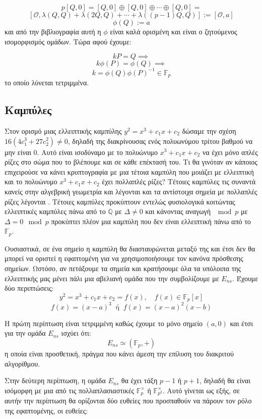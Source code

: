\documentclass[oneside,a4paper]{article}
\begin{document}
$$p[Q,0] = [Q,0] \oplus [Q,0] \oplus \cdots \oplus [Q,0] = $$
$$[\mathcal{O}, \lambda(Q,Q) + \lambda(2Q,Q) + \cdots + \lambda((p-1)Q,Q)] :=[\mathcal{O},a]$$
$$\phi(Q) := a$$ και από την βιβλιογραφία \cite{semaev} αυτή η $\phi$ είναι καλά ορισμένη και είναι ο ζητούμενος ισομορφισμός ομάδων. Τώρα αφού έχουμε:



$$k P = Q \implies $$
$$k \phi(P) = \phi(Q) \implies $$
$$k = \phi(Q) \phi(P)^{-1} \in \mathbb{F}_p$$ το οποίο λύνεται τετριμμένα.



\subsection{ Καμπύλες}
Στον ορισμό μιας ελλειπτικής καμπύλης $y^2 = x^3 + c_1 x +c_2$ δώσαμε την σχέση $16(4c_1^3 +27c_2^2)\neq 0$, δηλαδή της διακρίνουσας ενός πολυωνύμου τρίτου βαθμού να μην είναι $0$. Αυτό είναι ισοδύναμο με το πολυώνυμο $x^3 +c_1 x+c_2$ να έχει μόνο απλές ρίζες στο σώμα που το βλέπουμε και σε κάθε επέκτασή του. Τι θα γινόταν αν κάποιος επιχειρούσε να κάνει κρυπτογραφία με μια τέτοια καμπύλη που μοιάζει με ελλειπτική και το πολυώνυμο $x^3 + c_1x+c_2$ έχει πολλαπλές ρίζες? Τέτοιες καμπύλες τις συναντά κανείς στην αλγεβρική γεωμετρία και λέγονται  και τα αντίστοιχα σημεία με πολλαπλές ρίζες λέγονται . Τέτοιες καμπύλες προκύπτουν εντελώς φυσιολογικά κοιτώντας ελλειπτικές καμπύλες πάνω από το $\mathbb{Q}$ με $\Delta \neq 0$ και κάνοντας αναγωγή $\mod p$ με $\Delta = 0 \mod p$ προκύπτει πλέον μια καμπύλη που δεν είναι ελλειπτική πάνω από το $\mathbb{F}_p$.

Ουσιαστικά, σε ένα  σημείο η καμπύλη θα διασταυρώνεται μεταξύ της και έτσι δεν θα μπορεί να οριστεί η εφαπτομένη για να χρησιμοποιήσουμε τον κανόνα πρόσθεσης σημείων. Ωστόσο, αν πετάξουμε τα  σημεία και κρατήσουμε όλα τα υπόλοιπα της ελλειπτικής μας μένει πάλι μια αβελιανή ομάδα που την συμβολίζουμε με $E_{ns}$. Έχουμε δύο περιπτώσεις:
$$y^2 = x^3+c_1 x+c_2 = f(x), \quad f(x) \in \mathbb{F}_p[x]$$
$$f(x) = (x-a)^3 \ \text{ ή } \ f(x) = (x-a)^2(x-b)$$

Η πρώτη περίπτωση είναι τετριμμένη καθώς έχουμε το μόνο  σημείο $(a,0)$ και έτσι για την ομάδα $E_{ns}$ ισχύει ότι:
$$E_{ns} \simeq (\mathbb{F}_p,+)$$ η οποία είναι προσθετική, πράγμα που κάνει άμεση την επίλυση του διακριτού αλγορίθμου.

Στην δεύτερη περίπτωση, η ομάδα $E_{ns}$ θα έχει τάξη $p-1$ ή $p+1$, δηλαδή θα είναι ισόμορφη με μια από τις πολλαπλασιαστικές $\mathbb{F}_p^{\times}$ ή $\mathbb{F}_{p^2}^{\times}$. Αυτό γίνεται ως εξής, σε αυτήν την περίπτωση θα ορίζονται δύο ευθείες που προσπαθούν να πάρουν τον ρόλο της εφαπτομένης, οι ευθείες:
\end{document}
